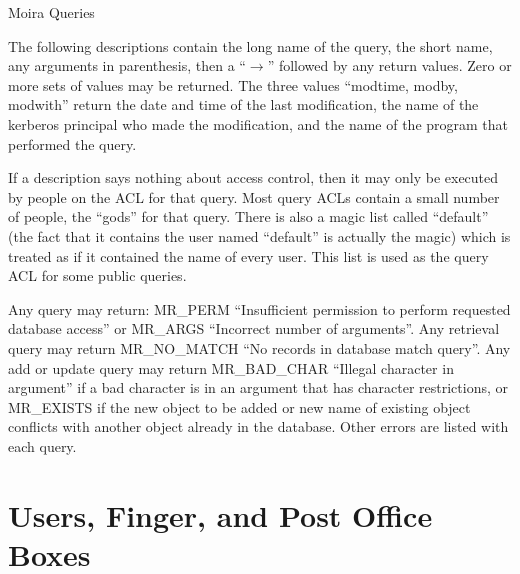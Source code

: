 \documentclass{article}
\begin{document}
\begin{center}
{\Large Moira Queries}
\end{center}

The following descriptions contain the long name of the query, the
short name, any arguments in parenthesis, then a ``$\rightarrow$''
followed by any return values. Zero or more sets of values may be
returned. The three values ``modtime, modby, modwith'' return the date
and time of the last modification, the name of the kerberos principal
who made the modification, and the name of the program that performed
the query.

If a description says nothing about access control, then it may only
be executed by people on the ACL for that query.  Most query ACLs
contain a small number of people, the ``gods'' for that query.  There is
also a magic list called ``default'' (the fact that it contains the user
named ``default'' is actually the magic) which is treated as if it
contained the name of every user.  This list is used as the query ACL
for some public queries.

Any query may return: MR\_PERM ``Insufficient permission to perform
requested database access'' or MR\_ARGS ``Incorrect number of
arguments''.  Any retrieval query may return MR\_NO\_MATCH ``No records
in database match query''.  Any add or update query may return
MR\_BAD\_CHAR ``Illegal character in argument'' if a bad character is in
an argument that has character restrictions, or MR\_EXISTS if the new
object to be added or new name of existing object conflicts with
another object already in the database.  Other errors are listed with
each query.


\section{Users, Finger, and Post Office Boxes}
\end{document}
